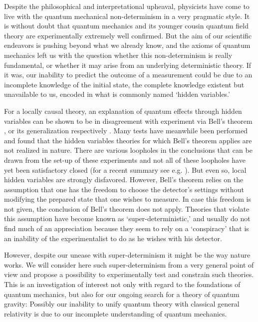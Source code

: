\documentclass{svjour2}                    %
\begin{document}
Despite the philosophical and interpretational upheaval, physicists 
have come to live with the quantum mechanical non-determinism in a very pragmatic style. 
It is without doubt that quantum mechanics and its younger cousin quantum 
field theory are experimentally extremely well confirmed. But the aim of our 
scientific endeavors is pushing beyond what we already know, and the axioms of quantum mechanics 
left us with the question whether this non-determinism is really fundamental, 
or whether it may arise from an underlying deterministic theory. If it was,
our inability to predict the outcome of a measurement could be due to an incomplete 
knowledge of the initial state, the complete knowledge existent but unavailable 
to us, encoded in what is commonly named `hidden variables.'

For a locally causal theory, an explanation of quantum effects through 
hidden variables can be shown to be in disagreement with experiment 
via Bell's theorem \cite{Bell:1964kc}, or its generalization respectively \cite{Clauser:1969ny}. 
Many tests \cite{Aspect:1982fx,Weihs:1998gy,Tittel:1998ja,Rowe,Moehring,Ansmann,Hasegawa} have meanwhile 
been performed and found that the hidden variables theories
for which Bell's theorem applies are not realized in nature. There are various loopholes
in the conclusions that can be drawn from the set-up of these experiments and not all of these
loopholes have yet been satisfactory closed (for a recent summary see e.g. \cite{loop}). But even so,
local hidden variables are strongly disfavored. However, Bell's theorem relies 
on the assumption that one has the freedom to choose the detector's settings without modifying the 
prepared state that one wishes to measure. In case this freedom is not given, the
conclusion of Bell's theorem does not apply. Theories that violate this assumption have become known 
as `super-deterministic,' and usually do not find much of an appreciation 
because they seem to rely on a `conspiracy' that is an inability of the
experimentalist to do as he wishes with his detector. 

However, despite our unease with super-determinism it might be 
the way nature works. We will consider here such super-determinism
from a very general point of view and propose a possibility to experimentally test and constrain
such theories. This is an investigation of interest not only with regard to the foundations 
of quantum mechanics, but also for our ongoing search for a theory of quantum
gravity: Possibly our inability to unify quantum theory with classical
general relativity is due to our incomplete understanding of quantum mechanics.
\end{document}
